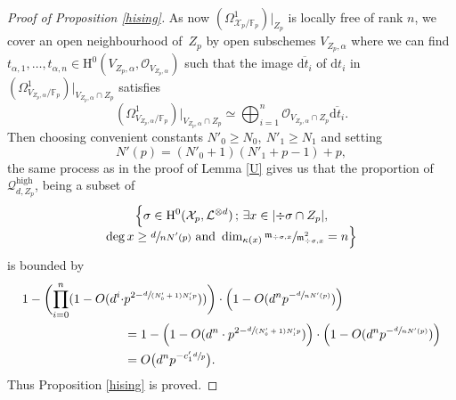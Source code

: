 \documentclass[JEP,XML,SOM,Unicode,published]{cedram}
\newcommand{\sep}{\,;\,}
\theoremstyle{plain}
\theoremstyle{definition}
\newcommand{\ho}{\mathrm{H}}
\newcommand{\m}{\mathfrak{m}}
\newcommand{\X}{\mathcal{X}}
\newcommand{\li}{\mathcal{L}}
\newcommand{\F}{\mathbb{F}}
\begin{document}
\begin{proof}[Proof of Proposition \ref{hising}]
As now $(\Omega^1_{\X_p/\F_p})|_{Z_p}$ is locally free of rank $n$, we cover an open neighbourhood of~$Z_p$ by open subschemes $V_{Z_p,\alpha}$ where we can find $t_{\alpha,1},\dots,t_{\alpha,n}\in \ho^0(V_{Z_p,\alpha},\mathcal{O}_{V_{Z_p,\alpha}})$ such that the image $\overline{\mathrm{d}t_i}$ of ${\mathrm{d}t_i}$ in $(\Omega^1_{V_{Z_p,\alpha}/\F_p})\big|_{{V_{Z_p,\alpha}\cap Z_p}}$ satisfies\vspace*{-3pt}
\[
(\Omega^1_{V_{Z_p,\alpha}/\F_p})\big|_{V_{Z_p,\alpha}\cap Z_p}\simeq \bigoplus_{i=1}^n\mathcal{O}_{V_{Z_p,\alpha}\cap Z_p}\overline{\mathrm{d}t_i}.
\]
Then choosing convenient constants $N'_0\geq N_0,\ N'_1\geq N_1$ and setting\vspace*{-3pt}
\[
N'(p)=(N'_0+1)(N'_1+p-1)+p,
\]
the same process as in the proof of Lemma \ref{U} gives us that the proportion of $\mathcal{Q}_{d,Z_p}^{\mathrm{high}}$, being a subset of\vspace*{-3pt}
\begin{multline*}
\Bigl\{ \sigma\in \ho^0(\X_{p}, \li^{\otimes d})\sep \exists x\in |{\div\sigma\cap Z_p}|,\\[-5pt]
\deg x\geq \sfrac{d}{nN'(p)}\text{ and } \dim_{\kappa(x)}\sfrac{\m_{\div \sigma,x}}{\m^2_{\div \sigma, x}}=n \Bigr\}
\end{multline*}
is bounded by
\begin{align*}
1-\biggl(\prod_{i=0}^{n}(1-O(d^i\cdot& p^{2-\sfrac{d}{(N'_0+1)N'_1p}})) \biggr) \cdot \left(1-O(d^{n}p^{-\sfrac{d}{nN'(p)}}) \right) \\
&=1-\left(1-O(d^{n}\cdot p^{2-\sfrac{d}{(N'_0+1)N'_1p}})\right)\cdot \left(1-O(d^{n}p^{-\sfrac{d}{nN'(p)}}) \right) \\
&=O\bigl(d^{n}p^{-c'_1\sfrac{d}{p}} \bigr).
\end{align*}
Thus Proposition \ref{hising} is proved.
\end{proof}

\label{step4}
\end{document}
